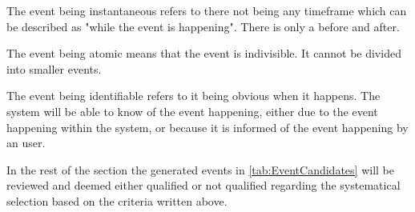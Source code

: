The event being instantaneous refers to there not being any timeframe which can be described as "while the event is happening". There is only a before and after.

The event being atomic means that the event is indivisible. It cannot be divided into smaller events.

The event being identifiable refers to it being obvious when it happens. The system will be able to know of the event happening, either due to the event happening within the system, or because it is informed of the event happening by an user.

In the rest of the section the generated events in \cref{tab:EventCandidates} will be reviewed and deemed either qualified or not qualified regarding the systematical selection based on the criteria written above.

